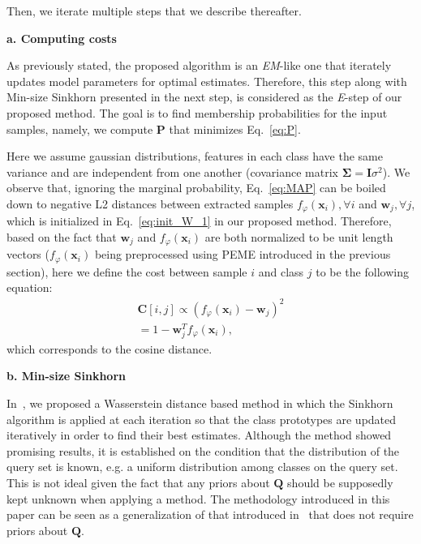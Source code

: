 \documentclass[review]{elsarticle}
\begin{document}
Then, we iterate multiple steps that we describe thereafter.

\textbf{a. Computing costs}

As previously stated, the proposed algorithm is an \emph{EM}-like one that iterately updates model parameters for optimal estimates. Therefore, this step along with Min-size Sinkhorn presented in the next step, is considered as the \emph{E}-step of our proposed method. The goal is to find membership probabilities for the input samples, namely, we compute $\mathbf{P}$ that minimizes Eq.~\ref{eq:P}.

Here we assume gaussian distributions, features in each class have the same variance and are independent from one another (covariance matrix $\mathbf{\Sigma}=\mathbf{I}\sigma^2$). We observe that, ignoring the marginal probability, Eq.~\ref{eq:MAP} can be boiled down to negative L2 distances between extracted samples $f_\varphi(\mathbf{x}_i), \forall i$ and $\mathbf{w}_j, \forall j$, which is initialized in Eq.~\ref{eq:init_W_1} in our proposed method. Therefore, based on the fact that $\mathbf{w}_j$ and $f_\varphi(\mathbf{x}_i)$ are both normalized to be unit length vectors ($f_\varphi(\mathbf{x}_i)$ being preprocessed using PEME introduced in the previous section), here we define the cost between sample $i$ and class $j$ to be the following equation:
\begin{equation}
\begin{split}
    \mathbf{C}[i,j] \propto (f_\varphi(\mathbf{x}_i)-\mathbf{w}_{j})^2 \\
    = 1-\mathbf{w}_{j}^{T} f_\varphi(\mathbf{x}_i),
\end{split}
\label{eq:C}
\end{equation}
which corresponds to the cosine distance.



\textbf{b. Min-size Sinkhorn}

In~\cite{hu2021leveraging}, we proposed a Wasserstein distance based method in which the Sinkhorn algorithm is applied at each iteration so that the class prototypes are updated iteratively in order to find their best estimates. Although the method showed promising results, it is established on the condition that the distribution of the query set is known, e.g. a uniform distribution among classes on the query set. This is not ideal given the fact that any priors about $\mathbf{Q}$ should be supposedly kept unknown when applying a method. The methodology introduced in this paper can be seen as a generalization of that introduced in~\cite{hu2021leveraging} that does not require priors about $\mathbf{Q}$.
\end{document}

